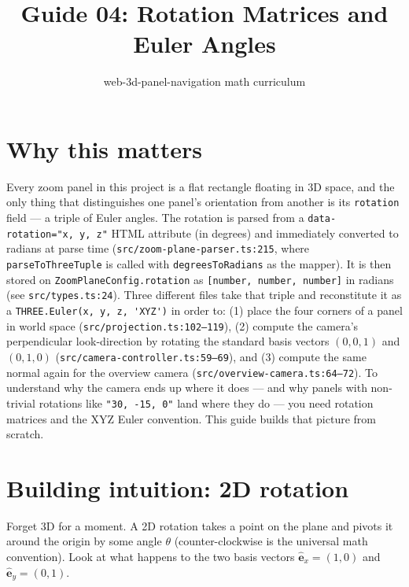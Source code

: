 \documentclass{article}
\title{Guide 04: Rotation Matrices and Euler Angles}
\author{web-3d-panel-navigation math curriculum}
\date{}
\begin{document}
\maketitle

\section{Why this matters}

Every zoom panel in this project is a flat rectangle floating in 3D space, and
the only thing that distinguishes one panel's orientation from another is its
\texttt{rotation} field --- a triple of Euler angles. The rotation is parsed
from a \texttt{data-rotation="x, y, z"} HTML attribute (in degrees) and
immediately converted to radians at parse time
(\texttt{src/zoom-plane-parser.ts:215}, where \lstinline|parseToThreeTuple| is
called with \lstinline|degreesToRadians| as the mapper). It is then stored on
\lstinline|ZoomPlaneConfig.rotation| as
\lstinline|[number, number, number]| in radians (see
\texttt{src/types.ts:24}). Three different files take that triple and reconstitute it as a
\lstinline|THREE.Euler(x, y, z, 'XYZ')| in order to: (1) place the four corners
of a panel in world space (\texttt{src/projection.ts:102--119}), (2) compute
the camera's perpendicular look-direction by rotating the standard basis
vectors $(0,0,1)$ and $(0,1,0)$ (\texttt{src/camera-controller.ts:59--69}),
and (3) compute the same normal again for the overview camera
(\texttt{src/overview-camera.ts:64--72}). To understand why the camera ends up
where it does --- and why panels with non-trivial rotations like
\texttt{"30, -15, 0"} land where they do --- you need rotation matrices and the
XYZ Euler convention. This guide builds that picture from scratch.

\section{Building intuition: 2D rotation}

Forget 3D for a moment. A 2D rotation takes a point on the plane and pivots
it around the origin by some angle $\theta$ (counter-clockwise is the universal
math convention). Look at what happens to the two basis vectors
$\hat{\mathbf{e}}_x = (1,0)$ and $\hat{\mathbf{e}}_y = (0,1)$.
\end{document}
